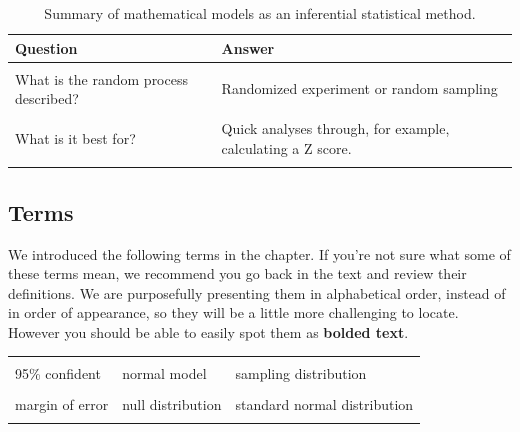 \documentclass[
  10pt,
  openany]{book}
\begin{document}
\begin{table}[!h]

\caption{\label{tab:chp13-summary}Summary of mathematical models as an inferential statistical method.}
\centering
\begin{tabu} to 
\toprule
Question & Answer\\
\midrule
{} & \\
\addlinespace
What is the random process described? & Randomized experiment or random sampling\\
\addlinespace
{} & \\
\addlinespace
What is it best for? & Quick analyses through, for example, calculating a Z score.\\
\addlinespace
{} & \\
\bottomrule
\end{tabu}
\end{table}

\clearpage

\hypertarget{terms-7}{%
\subsection{Terms}\label{terms-7}}

We introduced the following terms in the chapter.
If you're not sure what some of these terms mean, we recommend you go back in the text and review their definitions.
We are purposefully presenting them in alphabetical order, instead of in order of appearance, so they will be a little more challenging to locate.
However you should be able to easily spot them as \textbf{bolded text}.

\begin{tabu} to 
\toprule
{} &  & \\
95\% confident & normal model & sampling distribution\\
 &  & \\
margin of error & null distribution & standard normal distribution\\
 &  & \\
\bottomrule
\end{tabu}
\end{document}
